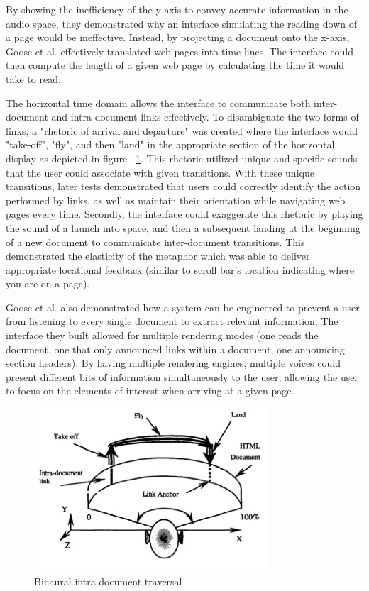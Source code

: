 By showing the inefficiency of the y-axis to convey accurate information in the
audio space, they demonstrated why an interface simulating the reading down of
a page would be ineffective. Instead, by projecting a document onto the x-axis,
Goose et al. effectively translated web pages into time lines.  The interface
could then compute the length of a given web page by calculating the time it
would take to read.

The horizontal time domain allows the interface to communicate both inter-document
and intra-document links effectively.  To disambiguate the two forms of links,
a "rhetoric of arrival and departure" was created where the interface would
"take-off", "fly", and then "land" in the appropriate section of the horizontal
display as depicted in figure ~\ref{fig:goose_intra}. This rhetoric utilized
unique and specific sounds that the user could associate with given transitions.
With these unique transitions, later tests demonstrated that users could
correctly identify the action performed by links, as well as maintain their
orientation while navigating web pages every time.  Secondly, the interface
could exaggerate this rhetoric by playing the sound of a launch into space,
and then a subsequent landing at the beginning of a new document to
communicate inter-document transitions. This demonstrated the elasticity of
the metaphor which was able to deliver appropriate locational feedback
(similar to scroll bar's location indicating where you are on a page).

Goose et al. also demonstrated how a system can be engineered to prevent a
user from listening to every single document to extract relevant information.
The interface they built allowed for multiple rendering modes (one reads the
document, one that only announced links within a document,  one announcing
section headers).  By having multiple rendering engines, multiple voices
could present different bits of information simultaneously to the user,
allowing the user to focus on the elements of interest when arriving at a
given page.

\begin{figure}[t]
    \centering
    \includegraphics[width=.7\linewidth]{images/goose_intra.jpg}
    \caption{Binaural intra document traversal}
    \label{fig:goose_intra}
\end{figure}

